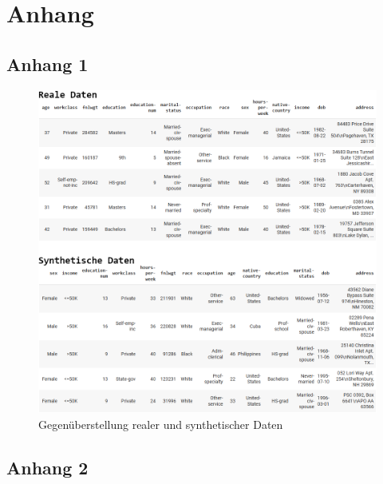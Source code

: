 \newpage
\chapter*{Anhang}
\label{cha:anhang}

\section*{Anhang 1}
\label{sec:anhang-1}

\begin{figure}[ht]
\begin{center}
\includegraphics[width=\textwidth]{img/real-vs-synthetic-data.png}
\caption[Gegenüberstellung realer und synthetischer Daten]{Gegenüberstellung realer und synthetischer Daten\footnotemark}
\label{fig:real-vs-synthetic}
\end{center}
\end{figure}

\newpage
\section*{Anhang 2}
\label{sec:anhang-2}

\inputminted{python}{lst/sdv.py}
